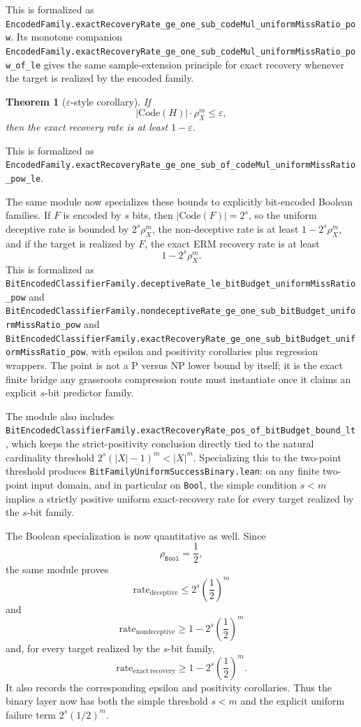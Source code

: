 \documentclass[11pt]{article}
\newtheorem{theorem}{Theorem}[section]
\theoremstyle{remark}
\begin{document}
\noindent
This is formalized as
\texttt{EncodedFamily.exactRecoveryRate\_ge\_one\_sub\_codeMul\_uniformMissRatio\_pow}.
Its monotone companion
\texttt{EncodedFamily.exactRecoveryRate\_ge\_one\_sub\_codeMul\_uniformMissRatio\_pow\_of\_le}
gives the same sample-extension principle for exact recovery whenever the
target is realized by the encoded family.

\begin{theorem}[\(\varepsilon\)-style corollary]
If
\[
  |\mathrm{Code}(H)| \cdot \rho_X^m \le \varepsilon,
\]
then the exact recovery rate is at least \(1 - \varepsilon\).
\end{theorem}

\noindent
This is formalized as
\texttt{EncodedFamily.exactRecoveryRate\_ge\_one\_sub\_of\_codeMul\_uniformMissRatio\_pow\_le}.

The same module now specializes these bounds to explicitly bit-encoded Boolean
families.  If \(F\) is encoded by \(s\) bits, then \(|\mathrm{Code}(F)| = 2^s\),
so the uniform deceptive rate is bounded by \(2^s\rho_X^m\), the non-deceptive
rate is at least \(1-2^s\rho_X^m\), and if the target is realized by \(F\), the
exact ERM recovery rate is at least
\[
  1 - 2^s \rho_X^m.
\]
This is formalized as
\texttt{BitEncodedClassifierFamily.deceptiveRate\_le\_bitBudget\_uniformMissRatio\_pow}
and
\texttt{BitEncodedClassifierFamily.nondeceptiveRate\_ge\_one\_sub\_bitBudget\_uniformMissRatio\_pow}
and
\texttt{BitEncodedClassifierFamily.exactRecoveryRate\_ge\_one\_sub\_bitBudget\_uniformMissRatio\_pow},
with epsilon and positivity corollaries plus regression wrappers.  The point is
not a P versus NP lower bound by itself; it is the exact finite bridge any
grassroots compression route must instantiate once it claims an explicit
\(s\)-bit predictor family.

The module also includes
\texttt{BitEncodedClassifierFamily.exactRecoveryRate\_pos\_of\_bitBudget\_bound\_lt},
which keeps the strict-positivity conclusion directly tied to the natural
cardinality threshold \(2^s(|X|-1)^m<|X|^m\).  Specializing this to the
two-point threshold produces \texttt{BitFamilyUniformSuccessBinary.lean}: on any
finite two-point input domain, and in particular on \texttt{Bool}, the simple
condition \(s<m\) implies a strictly positive uniform exact-recovery rate for
every target realized by the \(s\)-bit family.

The Boolean specialization is now quantitative as well.  Since
\[
  \rho_{\texttt{Bool}} = \frac{1}{2},
\]
the same module proves
\[
  \mathrm{rate}_{\mathrm{deceptive}}
  \le 2^s\left(\frac12\right)^m
\]
and
\[
  \mathrm{rate}_{\mathrm{nondeceptive}}
  \ge 1 - 2^s\left(\frac12\right)^m
\]
and, for every target realized by the \(s\)-bit family,
\[
  \mathrm{rate}_{\mathrm{exact\ recovery}}
  \ge 1 - 2^s\left(\frac12\right)^m.
\]
It also records the corresponding epsilon and positivity corollaries.  Thus the
binary layer now has both the simple threshold \(s<m\) and the explicit uniform
failure term \(2^s(1/2)^m\).
\end{document}
